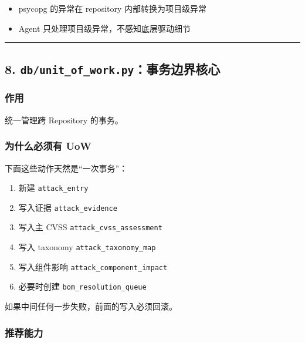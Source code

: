 \documentclass[UTF8]{ctexart}
\providecommand{\tightlist}{%
  \setlength{\itemsep}{0pt}\setlength{\parskip}{0pt}}
\begin{document}
\begin{itemize}
\tightlist
\item
  psycopg 的异常在 repository 内部转换为项目级异常
\item
  Agent 只处理项目级异常，不感知底层驱动细节
\end{itemize}

\begin{center}\rule{0.5\linewidth}{0.5pt}\end{center}

\hypertarget{dbunit_of_work.pyux4e8bux52a1ux8fb9ux754cux6838ux5fc3}{%
\subsection{\texorpdfstring{8.
\texttt{db/unit\_of\_work.py}：事务边界核心}{8. db/unit\_of\_work.py：事务边界核心}}\label{dbunit_of_work.pyux4e8bux52a1ux8fb9ux754cux6838ux5fc3}}

\hypertarget{ux4f5cux7528}{%
\subsubsection{作用}\label{ux4f5cux7528}}

统一管理跨 Repository 的事务。

\hypertarget{ux4e3aux4ec0ux4e48ux5fc5ux987bux6709-uow}{%
\subsubsection{为什么必须有
UoW}\label{ux4e3aux4ec0ux4e48ux5fc5ux987bux6709-uow}}

下面这些动作天然是``一次事务''：

\begin{enumerate}
\def\labelenumi{\arabic{enumi}.}
\tightlist
\item
  新建 \texttt{attack\_entry}
\item
  写入证据 \texttt{attack\_evidence}
\item
  写入主 CVSS \texttt{attack\_cvss\_assessment}
\item
  写入 taxonomy \texttt{attack\_taxonomy\_map}
\item
  写入组件影响 \texttt{attack\_component\_impact}
\item
  必要时创建 \texttt{bom\_resolution\_queue}
\end{enumerate}

如果中间任何一步失败，前面的写入必须回滚。

\hypertarget{ux63a8ux8350ux80fdux529b}{%
\subsubsection{推荐能力}\label{ux63a8ux8350ux80fdux529b}}
\end{document}
